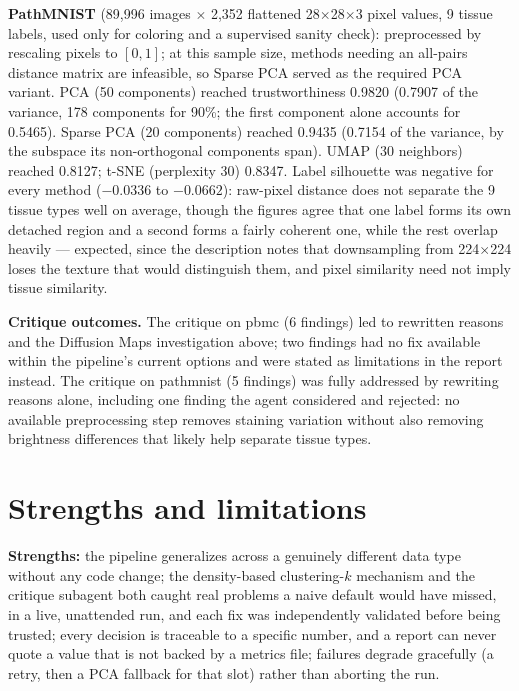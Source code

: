 \documentclass[10.5pt]{article}
\begin{document}
\textbf{PathMNIST} (89{,}996 images $\times$ 2{,}352 flattened 28$\times$28$\times$3 pixel values, 9 tissue labels, used only for coloring and a supervised sanity check): preprocessed by rescaling pixels to $[0,1]$; at this sample size, methods needing an all-pairs distance matrix are infeasible, so Sparse PCA served as the required PCA variant. PCA (50 components) reached trustworthiness 0.9820 (0.7907 of the variance, 178 components for 90\%; the first component alone accounts for 0.5465). Sparse PCA (20 components) reached 0.9435 (0.7154 of the variance, by the subspace its non-orthogonal components span). UMAP (30 neighbors) reached 0.8127; t-SNE (perplexity 30) 0.8347. Label silhouette was negative for every method ($-0.0336$ to $-0.0662$): raw-pixel distance does not separate the 9 tissue types well on average, though the figures agree that one label forms its own detached region and a second forms a fairly coherent one, while the rest overlap heavily --- expected, since the description notes that downsampling from 224$\times$224 loses the texture that would distinguish them, and pixel similarity need not imply tissue similarity.

\textbf{Critique outcomes.} The critique on pbmc (6 findings) led to rewritten reasons and the Diffusion Maps investigation above; two findings had no fix available within the pipeline's current options and were stated as limitations in the report instead. The critique on pathmnist (5 findings) was fully addressed by rewriting reasons alone, including one finding the agent considered and rejected: no available preprocessing step removes staining variation without also removing brightness differences that likely help separate tissue types.

\section{Strengths and limitations}

\textbf{Strengths:} the pipeline generalizes across a genuinely different data type without any code change; the density-based clustering-$k$ mechanism and the critique subagent both caught real problems a naive default would have missed, in a live, unattended run, and each fix was independently validated before being trusted; every decision is traceable to a specific number, and a report can never quote a value that is not backed by a metrics file; failures degrade gracefully (a retry, then a PCA fallback for that slot) rather than aborting the run.
\end{document}
